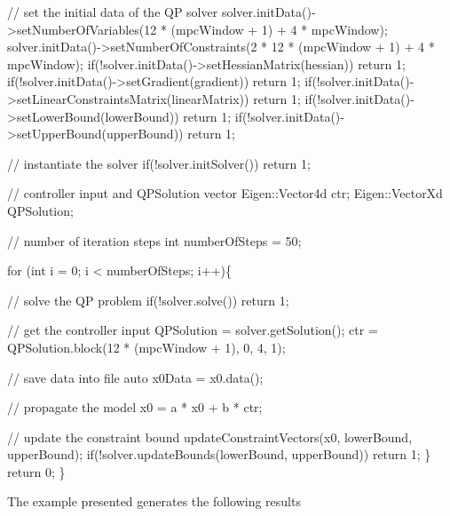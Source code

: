 \begin{DoxyCodeInclude}
    \textcolor{comment}{// set the initial data of the QP solver}
    solver.initData()->setNumberOfVariables(12 * (mpcWindow + 1) + 4 * mpcWindow);
    solver.initData()->setNumberOfConstraints(2 * 12 * (mpcWindow + 1) +  4 * mpcWindow);
    \textcolor{keywordflow}{if}(!solver.initData()->setHessianMatrix(hessian)) \textcolor{keywordflow}{return} 1;
    \textcolor{keywordflow}{if}(!solver.initData()->setGradient(gradient)) \textcolor{keywordflow}{return} 1;
    \textcolor{keywordflow}{if}(!solver.initData()->setLinearConstraintsMatrix(linearMatrix)) \textcolor{keywordflow}{return} 1;
    \textcolor{keywordflow}{if}(!solver.initData()->setLowerBound(lowerBound)) \textcolor{keywordflow}{return} 1;
    \textcolor{keywordflow}{if}(!solver.initData()->setUpperBound(upperBound)) \textcolor{keywordflow}{return} 1;

    \textcolor{comment}{// instantiate the solver}
    \textcolor{keywordflow}{if}(!solver.initSolver()) \textcolor{keywordflow}{return} 1;

    \textcolor{comment}{// controller input and QPSolution vector}
    Eigen::Vector4d ctr;
    Eigen::VectorXd QPSolution;

    \textcolor{comment}{// number of iteration steps}
    \textcolor{keywordtype}{int} numberOfSteps = 50;

    \textcolor{keywordflow}{for} (\textcolor{keywordtype}{int} i = 0; i < numberOfSteps; i++)\{

        \textcolor{comment}{// solve the QP problem}
        \textcolor{keywordflow}{if}(!solver.solve()) \textcolor{keywordflow}{return} 1;

        \textcolor{comment}{// get the controller input}
        QPSolution = solver.getSolution();
        ctr = QPSolution.block(12 * (mpcWindow + 1), 0, 4, 1);

        \textcolor{comment}{// save data into file}
        \textcolor{keyword}{auto} x0Data = x0.data();

        \textcolor{comment}{// propagate the model}
        x0 = a * x0 + b * ctr;

        \textcolor{comment}{// update the constraint bound}
        updateConstraintVectors(x0, lowerBound, upperBound);
        \textcolor{keywordflow}{if}(!solver.updateBounds(lowerBound, upperBound)) \textcolor{keywordflow}{return} 1;
      \}
    \textcolor{keywordflow}{return} 0;
\}
\end{DoxyCodeInclude}


The example presented generates the following results  